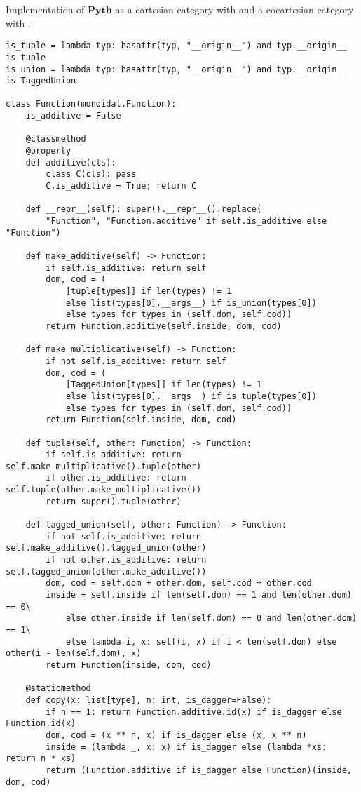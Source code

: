 \begin{python}
{\normalfont Implementation of $\mathbf{Pyth}$ as a cartesian category with  and a cocartesian category with .}

\begin{verbatim}
is_tuple = lambda typ: hasattr(typ, "__origin__") and typ.__origin__ is tuple
is_union = lambda typ: hasattr(typ, "__origin__") and typ.__origin__ is TaggedUnion

class Function(monoidal.Function):
    is_additive = False

    @classmethod
    @property
    def additive(cls):
        class C(cls): pass
        C.is_additive = True; return C

    def __repr__(self): super().__repr__().replace(
        "Function", "Function.additive" if self.is_additive else "Function")

    def make_additive(self) -> Function:
        if self.is_additive: return self
        dom, cod = (
            [tuple[types]] if len(types) != 1
            else list(types[0].__args__) if is_union(types[0])
            else types for types in (self.dom, self.cod))
        return Function.additive(self.inside, dom, cod)

    def make_multiplicative(self) -> Function:
        if not self.is_additive: return self
        dom, cod = (
            [TaggedUnion[types]] if len(types) != 1
            else list(types[0].__args__) if is_tuple(types[0])
            else types for types in (self.dom, self.cod))
        return Function(self.inside, dom, cod)

    def tuple(self, other: Function) -> Function:
        if self.is_additive: return self.make_multiplicative().tuple(other)
        if other.is_additive: return self.tuple(other.make_multiplicative())
        return super().tuple(other)

    def tagged_union(self, other: Function) -> Function:
        if not self.is_additive: return self.make_additive().tagged_union(other)
        if not other.is_additive: return self.tagged_union(other.make_additive())
        dom, cod = self.dom + other.dom, self.cod + other.cod
        inside = self.inside if len(self.dom) == 1 and len(other.dom) == 0\
            else other.inside if len(self.dom) == 0 and len(other.dom) == 1\
            else lambda i, x: self(i, x) if i < len(self.dom) else other(i - len(self.dom), x)
        return Function(inside, dom, cod)

    @staticmethod
    def copy(x: list[type], n: int, is_dagger=False):
        if n == 1: return Function.additive.id(x) if is_dagger else Function.id(x)
        dom, cod = (x ** n, x) if is_dagger else (x, x ** n)
        inside = (lambda _, x: x) if is_dagger else (lambda *xs: return n * xs)
        return (Function.additive if is_dagger else Function)(inside, dom, cod)


\end{verbatim}
\end{python}
